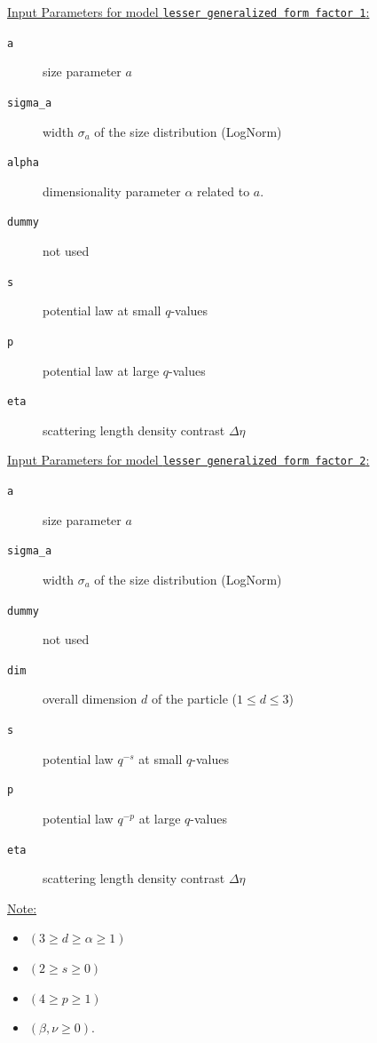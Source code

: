 \uline{Input Parameters for model \texttt{lesser generalized form factor 1}:}\\
\begin{description}
\item[\texttt{a}] size parameter $a$
\item[\texttt{sigma\_a}] width $\sigma_a$ of the size distribution (LogNorm)
\item[\texttt{alpha}] dimensionality parameter $\alpha$ related to $a$.
\item[\texttt{dummy}] not used
\item[\texttt{s}] potential law at small $q$-values
\item[\texttt{p}] potential law at large $q$-values
\item[\texttt{eta}] scattering length density contrast $\Delta\eta$
\end{description}

\vspace{5mm}

\uline{Input Parameters for model \texttt{lesser generalized form factor 2}:}\\
\begin{description}
\item[\texttt{a}] size parameter $a$
\item[\texttt{sigma\_a}] width $\sigma_a$ of the size distribution (LogNorm)
\item[\texttt{dummy}] not used
\item[\texttt{dim}] overall dimension $d$ of the particle ($1\leq d\leq 3$)
\item[\texttt{s}] potential law $q^{-s}$ at small $q$-values
\item[\texttt{p}] potential law $q^{-p}$ at large $q$-values
\item[\texttt{eta}] scattering length density contrast $\Delta\eta$
\end{description}

\vspace{5mm}

\uline{Note:}
\begin{itemize}
\item $(3\geq d\geq \alpha\geq 1)$
\item $(2\geq s\geq 0)$
\item  $(4\geq p \geq 1)$
\item $(\beta,\nu\geq 0)$.
\end{itemize}

